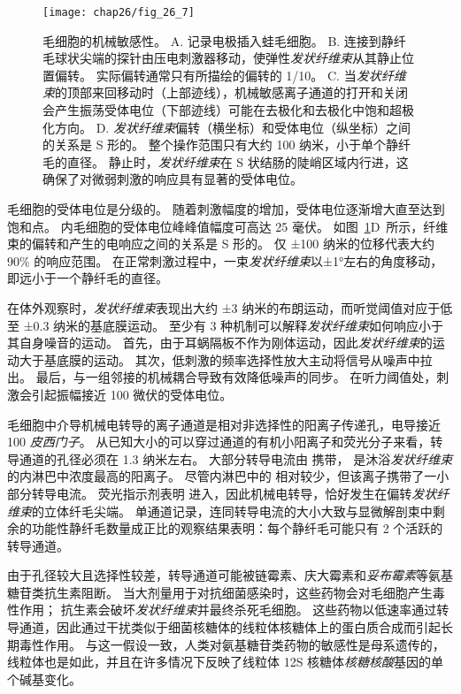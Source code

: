 \begin{figure}[htbp]
	\centering
	\texttt{[image: chap26/fig\_26\_7]}
	\caption{毛细胞的机械敏感性。
		A. 记录电极插入蛙毛细胞。
		B. 连接到静纤毛球状尖端的探针由压电刺激器移动，使弹性\textit{发状纤维束}从其静止位置偏转。
		实际偏转通常只有所描绘的偏转的 1/10。
		C. 当\textit{发状纤维束}的顶部来回移动时（上部迹线），机械敏感离子通道的打开和关闭会产生振荡受体电位（下部迹线）可能在去极化和去极化中饱和超极化方向。
		D. \textit{发状纤维束}偏转（横坐标）和受体电位（纵坐标）之间的关系是 S 形的。
		整个操作范围只有大约 100 纳米，小于单个静纤毛的直径。
		静止时，\textit{发状纤维束}在 S 状结肠的陡峭区域内行进，这确保了对微弱刺激的响应具有显著的受体电位。}
	\label{fig:26_7}
\end{figure}


毛细胞的受体电位是分级的。
随着刺激幅度的增加，受体电位逐渐增大直至达到饱和点。
内毛细胞的受体电位峰峰值幅度可高达 25 毫伏。
如图~\ref{fig:26_7}D~所示，纤维束的偏转和产生的电响应之间的关系是 S 形的。
仅 ±100 纳米的位移代表大约 90\% 的响应范围。
在正常刺激过程中，一束\textit{发状纤维束}以±1°左右的角度移动，即远小于一个静纤毛的直径。


在体外观察时，\textit{发状纤维束}表现出大约 ±3 纳米的布朗运动，而听觉阈值对应于低至 ±0.3 纳米的基底膜运动。
至少有 3 种机制可以解释\textit{发状纤维束}如何响应小于其自身噪音的运动。
首先，由于耳蜗隔板不作为刚体运动，因此\textit{发状纤维束}的运动大于基底膜的运动。
其次，低刺激的频率选择性放大主动将信号从噪声中拉出。
最后，与一组邻接的机械耦合导致有效降低噪声的同步。
在听力阈值处，刺激会引起振幅接近 100 微伏的受体电位。


毛细胞中介导机械电转导的离子通道是相对非选择性的阳离子传递孔，电导接近 100 \textit{皮西门子}。
从已知大小的可以穿过通道的有机小阳离子和荧光分子来看，转导通道的孔径必须在 1.3 纳米左右。
大部分转导电流由  携带， 是沐浴\textit{发状纤维束}的内淋巴中浓度最高的阳离子。
尽管内淋巴中的  相对较少，但该离子携带了一小部分转导电流。
荧光指示剂表明  进入，因此机械电转导，恰好发生在偏转\textit{发状纤维束}的立体纤毛尖端。
单通道记录，连同转导电流的大小大致与显微解剖束中剩余的功能性静纤毛数量成正比的观察结果表明：每个静纤毛可能只有 2 个活跃的转导通道。


由于孔径较大且选择性较差，转导通道可能被链霉素、庆大霉素和\textit{妥布霉素}等氨基糖苷类抗生素阻断。
当大剂量用于对抗细菌感染时，这些药物会对毛细胞产生毒性作用；
抗生素会破坏\textit{发状纤维束}并最终杀死毛细胞。
这些药物以低速率通过转导通道，因此通过干扰类似于细菌核糖体的线粒体核糖体上的蛋白质合成而引起长期毒性作用。
与这一假设一致，人类对氨基糖苷类药物的敏感性是母系遗传的，线粒体也是如此，并且在许多情况下反映了线粒体 12S 核糖体\textit{核糖核酸}基因的单个碱基变化。



